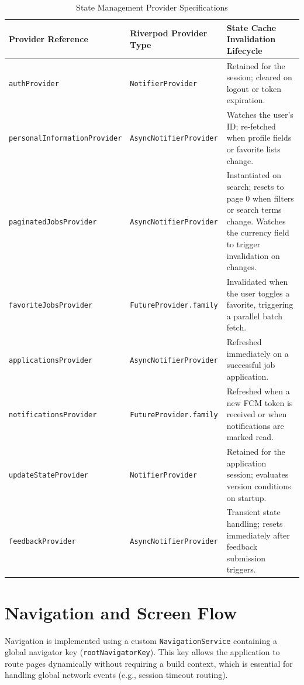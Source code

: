 \begin{table}[htbp]
\centering
\caption{State Management Provider Specifications}
\label{tab:state_management_design}
\begin{tabular}{|l|p{4cm}|p{6cm}|}
\hline
\textbf{Provider Reference} & \textbf{Riverpod Provider Type} & \textbf{State Cache Invalidation Lifecycle} \\ \hline
\texttt{authProvider} & \texttt{NotifierProvider} & Retained for the session; cleared on logout or token expiration. \\ \hline
\texttt{personalInformationProvider} & \texttt{AsyncNotifierProvider} & Watches the user's ID; re-fetched when profile fields or favorite lists change. \\ \hline
\texttt{paginatedJobsProvider} & \texttt{AsyncNotifierProvider} & Instantiated on search; resets to page 0 when filters or search terms change. Watches the currency field to trigger invalidation on changes. \\ \hline
\texttt{favoriteJobsProvider} & \texttt{FutureProvider.family} & Invalidated when the user toggles a favorite, triggering a parallel batch fetch. \\ \hline
\texttt{applicationsProvider} & \texttt{AsyncNotifierProvider} & Refreshed immediately on a successful job application. \\ \hline
\texttt{notificationsProvider} & \texttt{FutureProvider.family} & Refreshed when a new FCM token is received or when notifications are marked read. \\ \hline
\texttt{updateStateProvider} & \texttt{NotifierProvider} & Retained for the application session; evaluates version conditions on startup. \\ \hline
\texttt{feedbackProvider} & \texttt{AsyncNotifierProvider} & Transient state handling; resets immediately after feedback submission triggers. \\ \hline
\end{tabular}
\end{table}

\section{Navigation and Screen Flow}
Navigation is implemented using a custom \texttt{NavigationService} containing a global navigator key (\texttt{rootNavigatorKey}). This key allows the application to route pages dynamically without requiring a build context, which is essential for handling global network events (e.g., session timeout routing).

